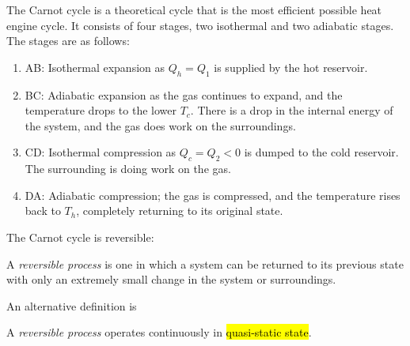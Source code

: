 \documentclass[a4paper,12pt]{article}
\begin{document}
The Carnot cycle is a theoretical cycle that is the most efficient possible heat engine cycle. It consists of four stages, two isothermal and two adiabatic stages. The stages are as follows:
\begin{enumerate}
  \item AB: Isothermal expansion as $Q_h = Q_1$ is supplied by the hot reservoir.
  \item BC: Adiabatic expansion as the gas continues to expand, and the temperature drops to the lower $T_c$. There is a drop in the internal energy of the system, and the gas does work on the surroundings.
  \item CD: Isothermal compression as $Q_c = Q_2 < 0$ is dumped to the cold reservoir. The surrounding is doing work on the gas.
  \item DA: Adiabatic compression; the gas is compressed, and the temperature rises back to $T_h$, completely returning to its original state.
\end{enumerate}

\pagebreak

The Carnot cycle is reversible:
\begin{center}
  A \textit{reversible process} is one in which a system can be returned to its previous state with only an extremely small change in the system or surroundings.
\end{center}
An alternative definition is
\begin{center}
  A \textit{reversible process} operates continuously in \hl{quasi-static state}.
\end{center}
\end{document}
